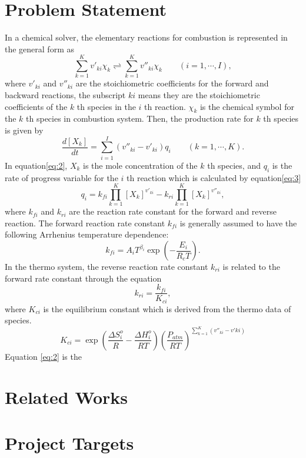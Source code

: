 \documentclass{article}
\begin{document}
\section{Problem Statement}
\qquad In a chemical solver, the elementary reactions for combustion is represented in the general form as
\begin{equation}
    \sum_{k=1}^Kv'_{ki}\chi_k\rightleftharpoons \sum_{k=1}^Kv''_{ki}\chi_k \qquad (i = 1, \cdots, I),
\end{equation}
where $v'_{ki}$ and $v''_{ki}$ are the stoichiometric coefficients for the forward and backward reactions,
 the subscript $ki$ means they are the stoichiometric coefficients of the $k$ th species in the $i$ th reaction.
 $\chi_k$ is the chemical symbol for the $k$ th species in combustion system.
Then, the production rate for $k$ th species is given by
\begin{equation}
    \frac{d[X_k]}{dt} = \sum_{i=1}^I (v''_{ki}-v'_{ki})q_i \qquad (k = 1, \cdots, K).
    \label{eq:2}
\end{equation}
In equation\eqref{eq:2}, $X_k$ is the mole concentration of the $k$ th species, 
and $q_i$ is the rate of progress variable for the $i$ th reaction which is calculated by equation\eqref{eq:3}
\begin{equation}
    q_i = k_{fi}\prod^K_{k=1}\left[X_k\right]^{v'_{ki}}-k_{ri}\prod^K_{k=1}\left[X_k\right]^{v''_{ki}},
    \label{eq:3}
\end{equation}
where $k_{fi}$ and $k_{ri}$ are the reaction rate constant for the forward and reverse reaction.
The forward reaction rate constant $k_{fi}$ is generally assumed to have the following Arrhenius temperature dependence:
\begin{equation}
    k_{fi} = A_iT^{\beta_i}\exp\left(-\frac{E_i}{R_cT}\right).
\end{equation}
In the thermo system, the reverse reaction rate constant $k_{ri}$ is related to the forward rate constant
through the equation
\begin{equation}
    k_{ri} = \frac{k_{fi}}{K_{ci}},
\end{equation}
where $K_{ci}$ is the equilibrium constant which is derived from the thermo data of species.
\begin{equation}
    K_{ci}= \exp\left(\frac{\Delta S_i^o}{R}-\frac{\Delta H_i^o}{RT}\right)\left(\frac{P_{atm}}{RT}\right)^{\sum_{k=1}^K(v''_{ki}-v'{ki})}
\end{equation}
Equation \eqref{eq:2} is the 
\section{Related Works}
\section{Project Targets}





\end{document}
